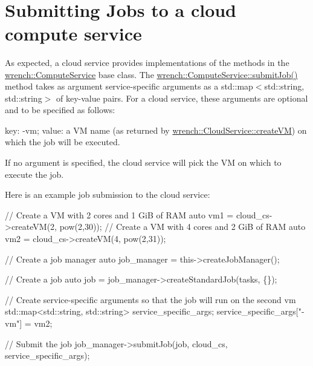  ~\newline
\hypertarget{guide-cloud_guide-cloud-using}{}\section{Submitting Jobs to a cloud compute service}\label{guide-cloud_guide-cloud-using}
As expected, a cloud service provides implementations of the methods in the {\ttfamily \hyperlink{classwrench_1_1_compute_service}{wrench\+::\+Compute\+Service}} base class. The {\ttfamily \hyperlink{classwrench_1_1_compute_service_abc9e51234c29965341727f07b446ff0c}{wrench\+::\+Compute\+Service\+::submit\+Job()}} method takes as argument service-\/specific arguments as a {\ttfamily std\+::map$<$std\+::string, std\+::string$>$} of key-\/value pairs. For a cloud service, these arguments are optional and to be specified as follows\+:


\begin{DoxyItemize}
\item key\+: {\ttfamily -\/vm}; value\+: a VM name (as returned by \hyperlink{classwrench_1_1_cloud_service_a6e614c2edbe303de83a47c024e84e250}{wrench\+::\+Cloud\+Service\+::create\+VM}) on which the job will be executed.
\end{DoxyItemize}

If no argument is specified, the cloud service will pick the VM on which to execute the job.

Here is an example job submission to the cloud service\+:


\begin{DoxyCode}
\textcolor{comment}{// Create a VM with 2 cores and 1 GiB of RAM}
\textcolor{keyword}{auto} vm1 = cloud\_cs->createVM(2, pow(2,30));
\textcolor{comment}{// Create a VM with 4 cores and 2 GiB of RAM}
\textcolor{keyword}{auto} vm2 = cloud\_cs->createVM(4, pow(2,31));

\textcolor{comment}{// Create a job manager}
\textcolor{keyword}{auto} job\_manager = this->createJobManager();

\textcolor{comment}{// Create a job}
\textcolor{keyword}{auto} job = job\_manager->createStandardJob(tasks, \{\});

\textcolor{comment}{// Create service-specific arguments so that the job will run on the second vm}
std::map<std::string, std::string> service\_specific\_args;
service\_specific\_args[\textcolor{stringliteral}{"-vm"}] = vm2;

\textcolor{comment}{// Submit the job}
job\_manager->submitJob(job, cloud\_cs, service\_specific\_args);
\end{DoxyCode}
 